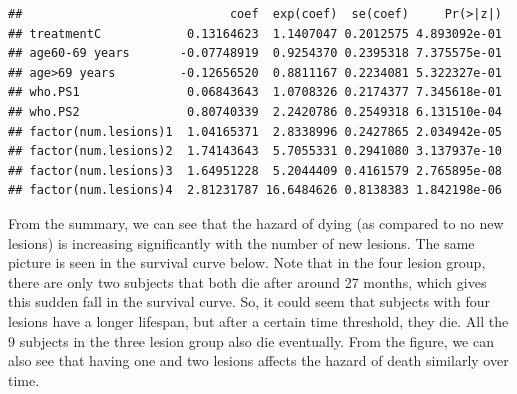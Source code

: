 \documentclass[
  11pt,
]{article}
\newenvironment{Shaded}{\begin{snugshade}}{\end{snugshade}}
\newcommand{\AttributeTok}[1]{\textcolor[rgb]{0.77,0.63,0.00}{#1}}
\newcommand{\DecValTok}[1]{\textcolor[rgb]{0.00,0.00,0.81}{#1}}
\newcommand{\FloatTok}[1]{\textcolor[rgb]{0.00,0.00,0.81}{#1}}
\newcommand{\FunctionTok}[1]{\textcolor[rgb]{0.00,0.00,0.00}{#1}}
\newcommand{\NormalTok}[1]{#1}
\newcommand{\OtherTok}[1]{\textcolor[rgb]{0.56,0.35,0.01}{#1}}
\newcommand{\SpecialCharTok}[1]{\textcolor[rgb]{0.00,0.00,0.00}{#1}}
\newcommand{\StringTok}[1]{\textcolor[rgb]{0.31,0.60,0.02}{#1}}
\begin{document}
\begin{Shaded}
\end{Shaded}

\begin{verbatim}
##                             coef  exp(coef)  se(coef)     Pr(>|z|)
## treatmentC            0.13164623  1.1407047 0.2012575 4.893092e-01
## age60-69 years       -0.07748919  0.9254370 0.2395318 7.375575e-01
## age>69 years         -0.12656520  0.8811167 0.2234081 5.322327e-01
## who.PS1               0.06843643  1.0708326 0.2174377 7.345618e-01
## who.PS2               0.80740339  2.2420786 0.2549318 6.131510e-04
## factor(num.lesions)1  1.04165371  2.8338996 0.2427865 2.034942e-05
## factor(num.lesions)2  1.74143643  5.7055331 0.2941080 3.137937e-10
## factor(num.lesions)3  1.64951228  5.2044409 0.4161579 2.765895e-08
## factor(num.lesions)4  2.81231787 16.6484626 0.8138383 1.842198e-06
\end{verbatim}

From the summary, we can see that the hazard of dying (as compared to no
new lesions) is increasing significantly with the number of new lesions.
The same picture is seen in the survival curve below. Note that in the
four lesion group, there are only two subjects that both die after
around 27 months, which gives this sudden fall in the survival curve.
So, it could seem that subjects with four lesions have a longer
lifespan, but after a certain time threshold, they die. All the 9
subjects in the three lesion group also die eventually. From the figure,
we can also see that having one and two lesions affects the hazard of
death similarly over time.
\end{document}
